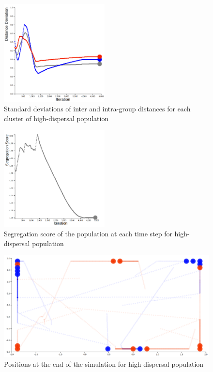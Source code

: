 \begin{figure}
    \centering
    \includegraphics[width=5.5cm]{imgs/final_dev_d.png}
    \caption{Standard deviations of inter and intra-group distances for each cluster of high-dispersal population}
    \label{fig:final_dev_d}
\end{figure}

\begin{figure}
    \centering
    \includegraphics[width=5.5cm]{imgs/final_seg_d.png}
    \caption{Segregation score of the population at each time step for high-dispersal population}
    \label{fig:final_seg_d}
\end{figure}

\begin{figure}
    \centering
    \includegraphics[width=\linewidth]{imgs/final_place_d.png}
    \caption{Positions at the end of the simulation for high dispersal population}
    \label{fig:final_pos_d}
\end{figure}



